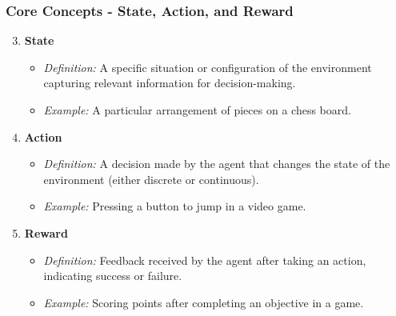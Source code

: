 \documentclass[aspectratio=169]{beamer}
\begin{document}
\begin{frame}[fragile]
    \frametitle{Core Concepts - State, Action, and Reward}
    \begin{enumerate}
        \setcounter{enumi}{2}
        \item \textbf{State}
        \begin{itemize}
            \item \textit{Definition:} A specific situation or configuration of the environment capturing relevant information for decision-making.
            \item \textit{Example:} A particular arrangement of pieces on a chess board.
        \end{itemize}
        
        \item \textbf{Action}
        \begin{itemize}
            \item \textit{Definition:} A decision made by the agent that changes the state of the environment (either discrete or continuous).
            \item \textit{Example:} Pressing a button to jump in a video game.
        \end{itemize}
        
        \item \textbf{Reward}
        \begin{itemize}
            \item \textit{Definition:} Feedback received by the agent after taking an action, indicating success or failure.
            \item \textit{Example:} Scoring points after completing an objective in a game.
        \end{itemize}
    \end{enumerate}
\end{frame}
\end{document}
